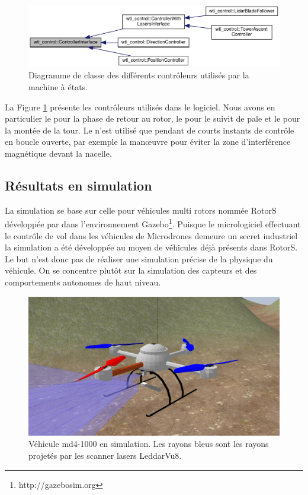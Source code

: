 \begin{figure}[htbp]
  \centering
  \includegraphics[width=\linewidth]{images/uml_controller.pdf}
  \caption{Diagramme de classe des différents contrôleurs utilisés par la machine à états.}
  \label{fig:uml_controller}
\end{figure}

La Figure \ref{fig:uml_controller} présente les contrôleurs utilisés dans le logiciel. Nous avons en particulier le  pour la phase de retour au rotor, le  pour le suivit de pale et le  pour la montée de la tour. Le  n'est utilisé que pendant de courts instants de contrôle en boucle ouverte, par exemple la man\oe uvre pour éviter la zone d'interférence magnétique devant la nacelle.

\subsection{Résultats en simulation}
\label{subsec:results_simu}
La simulation se base sur celle pour véhicules multi rotors nommée RotorS développée par \citep{Furrer2016} dans l'environnement Gazebo\footnote{http://gazebosim.org}. Puisque le micrologiciel effectuant le contrôle de vol dans les véhicules de Microdrones demeure un secret industriel la simulation a été développée au moyen de véhicules déjà présents dans RotorS.
Le but n'est donc pas de réaliser une simulation précise de la physique du véhicule. On se concentre plutôt sur la simulation des capteurs et des comportements autonomes de haut niveau.

\begin{figure}[htp]
  \centering
    \centering
    \includegraphics[width=0.7\linewidth]{images/sim_vehicle_closeup.jpg}
  \caption{Véhicule md4-1000 en simulation. Les rayons bleus sont les rayons projetés par les scanner lasers LeddarVu8.}
  \label{fig:sim_vehicle_closeup}
\end{figure}

